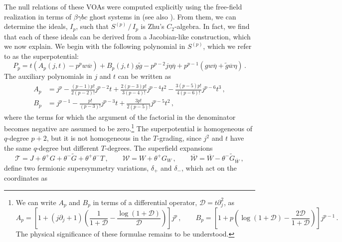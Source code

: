 \documentclass[12pt]{article}
\numberwithin{equation}{section}
\numberwithin{figure}{section}
\theoremstyle{plain}
\theoremstyle{definition}
\begin{document}
The null relations of these VOAs were computed explicitly using the free-field realization in terms of $\beta\gamma bc$ ghost systems in \cite{Bonetti:2018fqz} (see also \cite{Agarwal:2021oyl}). From them, we can determine the ideals, $I_p$, such that $S^{(p)} \, / \, I_p$ is Zhu's $C_2$-algebra. In fact, we find that each of these ideals can be derived from a Jacobian-like construction, which we now explain. We begin with the following polynomial in $S^{(p)}$, which we refer to as the superpotential:
\begin{equation}
    P_p = t(A_p(j,t) - p^p w \overline{w}) + B_p(j,t)g\widetilde{g} - p^{p-2} j\eta\overline{\eta} + p^{p-1} (g w \overline{\eta} + \widetilde{g} \overline{w} \eta ) \,.
\end{equation}
The auxiliary polynomials in $j$ and $t$ can be written as
\begin{equation}
    \begin{aligned}
        A_p &= j^p
-\frac{(p-1)p!}{2(p-2)!}j^{p-2}t
+\frac{2(p-3)p!}{3(p-4)!}j^{p-4}t^2
-\frac{3(p-5)p!}{4(p-6)!}j^{p-6}t^3 \,, \\
        B_p &= j^{p-1}
-\frac{p!}{(p-3)!}j^{p-3}t
+\frac{3p!}{2(p-5)!}j^{p-5}t^2  \,,
    \end{aligned}
\end{equation}
where the terms for which the argument of the factorial in the denominator becomes negative are assumed to be zero.\footnote{We can write $A_p$ and $B_p$ in terms of a differential operator, $\mathcal{D} = t \partial_j^2$, as
\begin{equation*}
    A_p = \left[ 1 + (j \partial_j + 1)\left(\frac{1}{1 + \mathcal{D}} - \frac{\log(1 + \mathcal{D})}{\mathcal{D}}\right)\right] j^p \,, \qquad B_p = \left[ 1 + p\left(\log(1 + \mathcal{D}) - \frac{2\mathcal{D}}{1 + \mathcal{D}}\right)\right] j^{p-1} \,. 
\end{equation*}
The physical significance of these formulae remains to be understood.} The superpotential is homogeneous of $q$-degree $p + 2$, but it is not homogeneous in the $T$-grading, since $j^2$ and $t$ have the same $q$-degree but different $T$-degrees. The superfield expansions
\begin{equation}\label{eqn:N3superfields}
    \mathcal{T} = J + \theta^+ G + \theta^- \widetilde{G} + \theta^+ \theta^- T \,, \qquad \mathcal{W} = W + \theta^+ G_W \,, \qquad \overline{\mathcal{W}} = \overline{W} - \theta^- \widetilde{G}_{\overline{W}} \,,
\end{equation}
define two fermionic supersymmetry variations, $\delta_+$ and $\delta_-$, which act on the coordinates as
\end{document}
